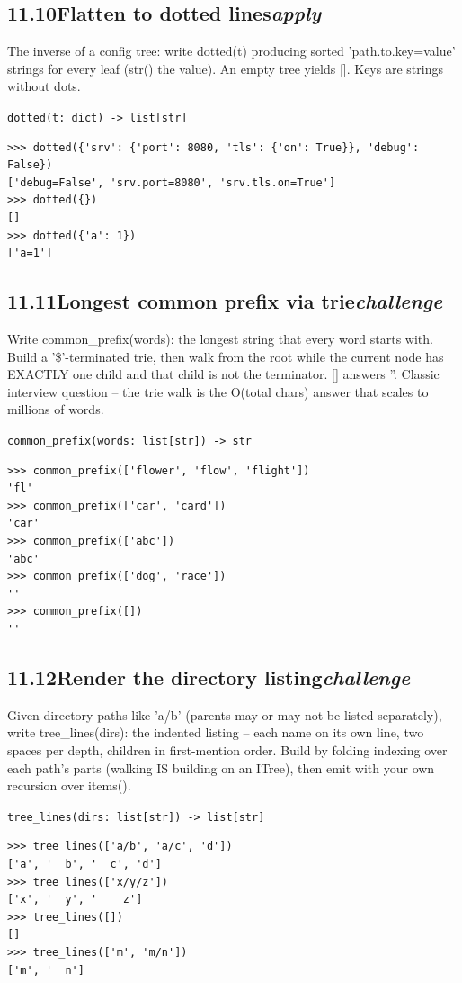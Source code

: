 \documentclass[10pt,letterpaper]{book}
\begin{document}
\subsection*{11.10\quad Flatten to dotted lines\hfill\textnormal{\textit{apply}}}
The inverse of a config tree: write dotted(t) producing sorted 'path.to.key=value' strings for every leaf (str() the value). An empty tree yields []. Keys are strings without dots.

\noindent\texttt{dotted(t: dict) -> list[str]}
\begin{lstlisting}[style=ex]
>>> dotted({'srv': {'port': 8080, 'tls': {'on': True}}, 'debug': False})
['debug=False', 'srv.port=8080', 'srv.tls.on=True']
>>> dotted({})
[]
>>> dotted({'a': 1})
['a=1']
\end{lstlisting}

\subsection*{11.11\quad Longest common prefix via trie\hfill\textnormal{\textit{challenge}}}
Write common\_prefix(words): the longest string that every word starts with. Build a '\$'-terminated trie, then walk from the root while the current node has EXACTLY one child and that child is not the terminator. [] answers ''. Classic interview question -- the trie walk is the O(total chars) answer that scales to millions of words.

\noindent\texttt{common\_prefix(words: list[str]) -> str}
\begin{lstlisting}[style=ex]
>>> common_prefix(['flower', 'flow', 'flight'])
'fl'
>>> common_prefix(['car', 'card'])
'car'
>>> common_prefix(['abc'])
'abc'
>>> common_prefix(['dog', 'race'])
''
>>> common_prefix([])
''
\end{lstlisting}
\subsection*{11.12\quad Render the directory listing\hfill\textnormal{\textit{challenge}}}
Given directory paths like 'a/b' (parents may or may not be listed separately), write tree\_lines(dirs): the indented listing -- each name on its own line, two spaces per depth, children in first-mention order. Build by folding indexing over each path's parts (walking IS building on an ITree), then emit with your own recursion over items().

\noindent\texttt{tree\_lines(dirs: list[str]) -> list[str]}
\begin{lstlisting}[style=ex]
>>> tree_lines(['a/b', 'a/c', 'd'])
['a', '  b', '  c', 'd']
>>> tree_lines(['x/y/z'])
['x', '  y', '    z']
>>> tree_lines([])
[]
>>> tree_lines(['m', 'm/n'])
['m', '  n']
\end{lstlisting}
\clearpage
\end{document}
